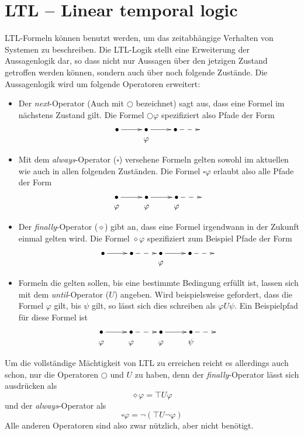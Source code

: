 \section{LTL -- Linear temporal logic}
LTL-Formeln können benutzt werden, um das zeitabhängige Verhalten von Systemen zu beschreiben\cite{ltlbasics}.
Die LTL-Logik stellt eine Erweiterung der Aussagenlogik dar, so dass nicht nur Aussagen über den jetzigen Zustand getroffen werden können, sondern auch über noch folgende Zustände.
Die Aussagenlogik wird um folgende Operatoren erweitert:
\begin{itemize}
\item Der \emph{next}-Operator (Auch mit $\bigcirc$ bezeichnet) sagt aus, dass eine Formel im nächstens Zustand gilt.
  Die Formel $\bigcirc\varphi$ spezifiziert also Pfade der Form
  \[ \xymatrix @R=0em {
      \bullet \ar[r] & \bullet \ar[r] & \bullet \ar@{-->}[r] &\\
      & \varphi & &
  }
    \]
\item Mit dem \emph{always}-Operator ($\square$) versehene Formeln gelten sowohl im aktuellen wie auch in allen folgenden Zuständen.
  Die Formel $\square\varphi$ erlaubt also alle Pfade der Form
  \[ \xymatrix @R=0em {
      \bullet \ar[r] & \bullet \ar[r] & \bullet \ar@{-->}[r] &\\
      \varphi & \varphi & \varphi &
  }
    \]
\item Der \emph{finally}-Operator ($\diamond$) gibt an, dass eine Formel irgendwann in der Zukunft einmal gelten wird.
  Die Formel $\diamond\varphi$ spezifiziert zum Beispiel Pfade der Form
  \[ \xymatrix @R=0em {
    \bullet \ar[r] & \bullet \ar@{-->}[r] & \bullet \ar[r] & \bullet \ar@{-->}[r] & \\
    & & \varphi & &
  } \]
\item Formeln die gelten sollen, bis eine bestimmte Bedingung erfüllt ist, lassen sich mit dem \emph{until}-Operator ($U$) angeben.
  Wird beispielsweise gefordert, dass die Formel $\varphi$ gilt, bis $\psi$ gilt, so lässt sich dies schreiben als $\varphi U\psi$.
  Ein Beispielpfad für diese Formel ist
  \[ \xymatrix @R=0em {
    \bullet \ar[r] & \bullet \ar@{-->}[r] & \bullet \ar[r] & \bullet \ar@{-->}[r] & \\
    \varphi & \varphi & \varphi & \psi &
  } \]
\end{itemize}
Um die vollständige Mächtigkeit von LTL zu erreichen reicht es allerdings auch schon, nur die Operatoren $\bigcirc$ und $U$ zu haben, denn der \emph{finally}-Operator lässt sich ausdrücken als
\[ \diamond\varphi = \top U \varphi \]
und der \emph{always}-Operator als
\[ \square\varphi = \lnot (\top U \lnot\varphi) \]
Alle anderen Operatoren sind also zwar nützlich, aber nicht benötigt.
